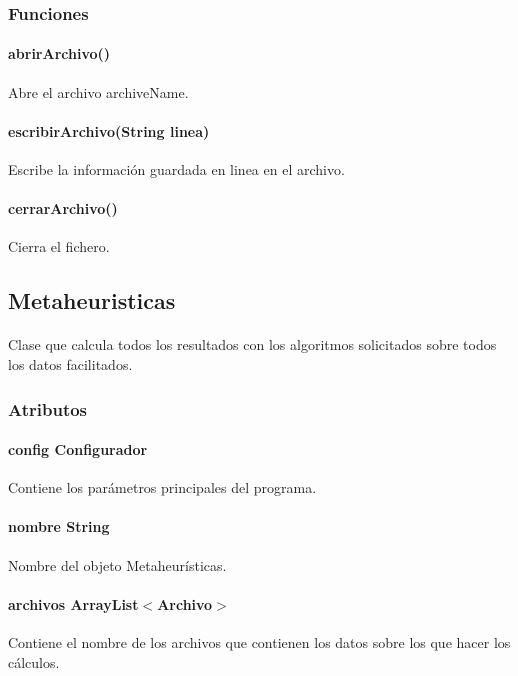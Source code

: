 \documentclass{article}
\begin{document}
	\subsubsection{Funciones}
	
	\paragraph{abrirArchivo()}Abre el archivo archiveName.
	
	\paragraph{escribirArchivo(String linea)}Escribe la información guardada en linea en el archivo.
	
	\paragraph{cerrarArchivo()}Cierra el fichero.
	
	\subsection{Metaheuristicas}
	
	\paragraph{}Clase que calcula todos los resultados con los algoritmos solicitados sobre todos los datos facilitados.
	
	\subsubsection{Atributos}
	
	\paragraph{config Configurador}Contiene los parámetros principales del programa.
	
	\paragraph{nombre String}Nombre del objeto Metaheurísticas.
	
	\paragraph{archivos ArrayList$<$Archivo$>$}Contiene el nombre de los archivos que contienen los datos sobre los que hacer los cálculos.
	
\end{document}
